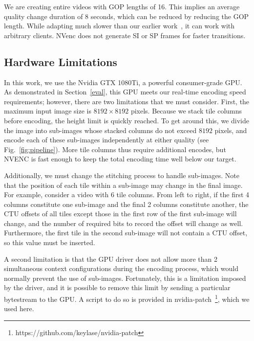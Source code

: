 We are creating  entire videos with GOP lengths of 16. This implies an average quality change duration of 8 seconds, which can be reduced by reducing the GOP length. While adapting much slower than our earlier work~\cite{ism-2018}, it can work with arbitrary clients. NVenc does not generate SI or SP frames for faster transitions.

\subsection{Hardware Limitations}

In this work, we use the Nvidia GTX 1080Ti, a powerful consumer-grade GPU. As demonstrated in Section~\ref{eval}, this GPU meets our real-time encoding speed requirements; however, there are two limitations that we must consider.
%
First, the maximum input image size is $8192\times8192$ pixels. Because we stack tile columns before encoding, the height limit is quickly reached. To get around this, we divide the image into sub-images whose stacked columns do not exceed $8192$ pixels, and encode each of these sub-images independently at either quality (see Fig.~\ref{fig:pipeline}). More tile columns thus require additional encodes, but NVENC is fast enough to keep the total encoding time well below our target.

Additionally, we must change the stitching process to handle sub-images. Note that the position of each tile within a sub-image may change in the final image. For example, consider a video with 6 tile columns. From left to right, if the first 4 columns constitute one sub-image and the final 2 columns constitute another, the CTU offsets of all tiles except those in the first row of the first sub-image will change, and the number of required bits to record the offset will change as well. Furthermore, the first tile in the second sub-image will not contain a CTU offset, so this value must be inserted.

A second limitation is that the GPU driver does not allow more than 2 simultaneous context configurations during the encoding process, which would normally prevent the use of sub-images. Fortunately, this is a limitation imposed by the driver, and it is possible to remove this limit by sending a particular bytestream to the GPU. A script to do so is provided in nvidia-patch~\footnote{https://github.com/keylase/nvidia-patch}, which we used here.





